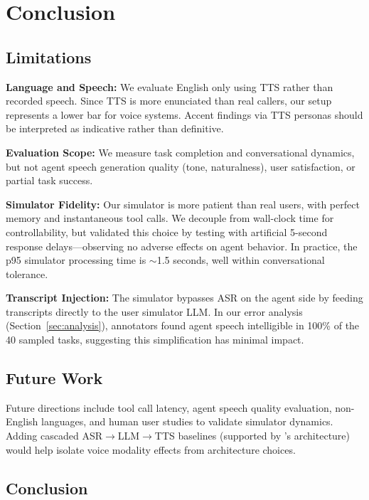 \section{Conclusion}
\label{sec:conclusion}

\subsection{Limitations}

\textbf{Language and Speech:} We evaluate English only using TTS rather than recorded speech. Since TTS is more enunciated than real callers, our setup represents a lower bar for voice systems. Accent findings via TTS personas should be interpreted as indicative rather than definitive.

\textbf{Evaluation Scope:} We measure task completion and conversational dynamics, but not agent speech generation quality (tone, naturalness), user satisfaction, or partial task success.

\textbf{Simulator Fidelity:} Our simulator is more patient than real users, with perfect memory and instantaneous tool calls. We decouple from wall-clock time for controllability, but validated this choice by testing with artificial 5-second response delays---observing no adverse effects on agent behavior. In practice, the p95 simulator processing time is $\sim$1.5 seconds, well within conversational tolerance.

\textbf{Transcript Injection:} The simulator bypasses ASR on the agent side by feeding transcripts directly to the user simulator LLM. In our error analysis (Section~\ref{sec:analysis}), annotators found agent speech intelligible in 100\% of the 40 sampled tasks, suggesting this simplification has minimal impact.

\subsection{Future Work}

Future directions include tool call latency, agent speech quality evaluation, non-English languages, and human user studies to validate simulator dynamics. Adding cascaded ASR$\rightarrow$LLM$\rightarrow$TTS baselines (supported by \tauvoice{}'s architecture) would help isolate voice modality effects from architecture choices. 

\subsection{Conclusion}

